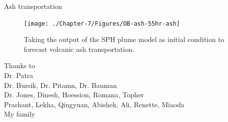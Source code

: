 \documentclass{beamer}
\begin{document}
\begin{frame}{Ash transportation}
\begin{figure}[!htb]
\begin{minipage}{.295\textwidth}
    \end{minipage}%
    \begin{minipage}{.295\textwidth}
        \centering
        \texttt{[image: ./Chapter-7/Figures/OB-ash-55hr-ash]}
    \end{minipage}%
    \caption{Taking the output of the SPH plume model as initial condition to forecast volcanic ash transportation.}
    \label{fig:Plume-SPH-Pinatubo-SO2-cloud}
\end{figure}
\end{frame}


\begin{frame}{}
\center
\huge{
Thanks to \\}
\Large
{
Dr. Patra \\
Dr. Bursik, Dr. Pitamn, Dr. Bauman \\
Dr. Jones, Dinesh, Hoession, Romana, Topher \\
Prashant, Lekha, Qingyuan, Abishek, Ali, Renette, Miaoda \\
My family \\
}
\end{frame}


%
%    
%    
%
% 
%    
%
\end{document}
